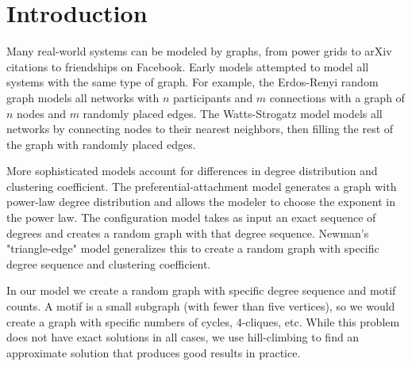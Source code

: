 \section{Introduction}
\label{sec:intro}

Many real-world systems can be modeled by graphs, from power grids to arXiv citations to friendships on Facebook.  Early models attempted to model all systems with the same type of graph.  For example, the Erdos-Renyi random graph models all networks with $n$ participants and $m$ connections with a graph of $n$ nodes and $m$ randomly placed edges.  The Watts-Strogatz model models all networks by connecting nodes to their nearest neighbors, then filling the rest of the graph with randomly placed edges.

More sophisticated models account for differences in degree distribution and clustering coefficient.  The preferential-attachment model generates a graph with power-law degree distribution and allows the modeler to choose the exponent in the power law.  The configuration model takes as input an exact sequence of degrees and creates a random graph with that degree sequence.  Newman's "triangle-edge" model generalizes this to create a random graph with specific degree sequence and clustering coefficient.

In our model we create a random graph with specific degree sequence and motif counts.  A motif is a small subgraph (with fewer than five vertices), so we would create a graph with specific numbers of cycles, 4-cliques, etc.  While this problem does not have exact solutions in all cases, we use hill-climbing to find an approximate solution that produces good results in practice.